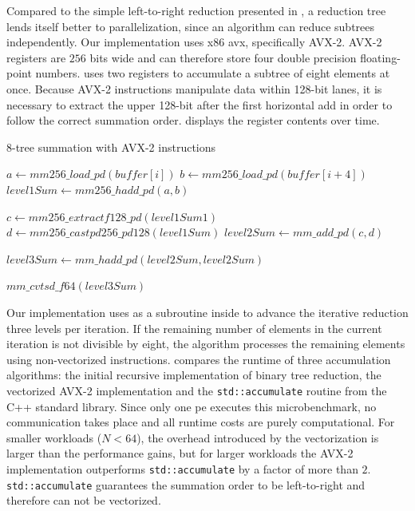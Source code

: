 Compared to the simple left-to-right reduction presented in , a reduction tree lends itself better to parallelization, since an algorithm can reduce subtrees independently.
Our implementation uses x86 \gls{avx}, specifically AVX-2.
AVX-2 registers are $256$ bits wide and can therefore store four double precision floating-point numbers.
 uses two registers to accumulate a subtree of eight elements at once.
Because AVX-2 instructions manipulate data within 128-bit lanes, it is necessary to extract the upper 128-bit after the first horizontal add in order to follow the correct summation order.
 displays the register contents over time.
\begin{algorithm}
\caption{8-tree summation with AVX-2 instructions}
\label{algo:AVXTreeAccumulation}
\DontPrintSemicolon
\SetAlgoLined
{}

$a \gets mm256\_load\_pd(buffer[i])$\;
$b \gets mm256\_load\_pd(buffer[i + 4])$\;
$level1Sum \gets mm256\_hadd\_pd(a,b)$\;

$c \gets mm256\_extractf128\_pd(level1Sum 1)$\;
$d \gets mm256\_castpd256\_pd128(level1Sum)$\;
$level2Sum \gets mm\_add\_pd(c, d)$\;

$level3Sum \gets mm\_hadd\_pd(level2Sum, level2Sum)$\;

\Return $mm\_cvtsd\_f64(level3Sum)$\;
\end{algorithm}

Our implementation uses  as a subroutine inside  to advance the iterative reduction three levels per iteration.
If the remaining number of elements in the current iteration is not divisible by eight, the algorithm processes the remaining elements using non-vectorized instructions.
 compares the runtime of three accumulation algorithms: the initial recursive implementation of binary tree reduction, the vectorized AVX-2 implementation and the \texttt{std::accumulate} routine from the C++ standard library.
Since only one \gls{pe} executes this microbenchmark, no communication takes place and all runtime costs are purely computational.
For smaller workloads ($N < 64$), the overhead introduced by the vectorization is larger than the performance gains, but for larger workloads the AVX-2 implementation outperforms \texttt{std::accumulate} by a factor of more than $2$.
\texttt{std::accumulate} guarantees the summation order to be left-to-right and therefore can not be vectorized.

